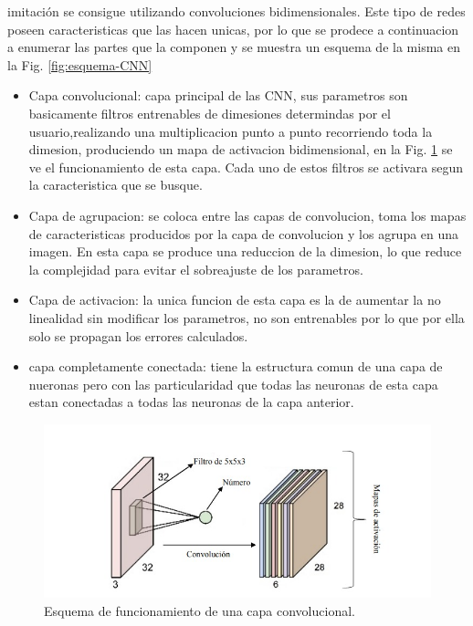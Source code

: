 imitación se consigue utilizando convoluciones bidimensionales. Este tipo de redes poseen caracteristicas que las hacen unicas, por lo que
se prodece a continuacion a enumerar las partes que la componen y se muestra un esquema de la misma en la Fig. \ref*{fig:esquema-CNN}
\begin{itemize}
    \item Capa convolucional: capa principal de las CNN, sus parametros son basicamente filtros entrenables de dimesiones determindas por el
          usuario,realizando una multiplicacion punto a punto recorriendo toda la dimesion, produciendo un mapa de activacion bidimensional, en la
          Fig. \ref{fig:esquema-capa-convolucional} se ve el funcionamiento de esta capa. Cada uno de estos filtros se activara segun la
          caracteristica que se busque.
    \item Capa de agrupacion: se coloca entre las capas de convolucion, toma los mapas de caracteristicas producidos por la capa de
          convolucion y los agrupa en una imagen. En esta capa se produce una reduccion de la dimesion, lo que reduce la complejidad 
          para evitar el sobreajuste de los parametros.
    \item Capa de activacion: la unica funcion de esta capa es la de aumentar la no linealidad sin modificar los parametros, no son entrenables
          por lo que por ella solo se propagan los errores calculados.
    \item capa completamente conectada: tiene la estructura comun de una capa de nueronas pero con las particularidad que todas las neuronas
          de esta capa estan conectadas a todas las neuronas de la capa anterior.
\end{itemize}
\begin{figure}
    \centering
    \includegraphics[width=1\textwidth]{imgs/capa-convolucional.jpeg}
    \caption{Esquema de funcionamiento de una capa convolucional.}
    \label{fig:esquema-capa-convolucional}
\end{figure}
